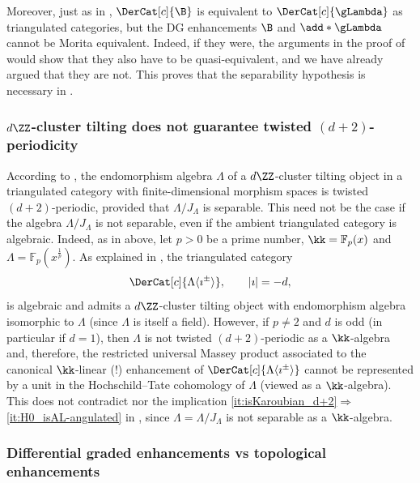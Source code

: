 \documentclass[a4paper]{amsart}
\begin{document}
Moreover, just as in \cite{RVdB20}, $\DerCat[c]{\B}$ is equivalent to $\DerCat[c]{\gLambda}$ as triangulated categories, but the DG enhancements $\B$ and $\add*{\gLambda}$ cannot be Morita equivalent. Indeed, if they were, the arguments in the proof of  would show that they also have to be quasi-equivalent, and we have already argued that they are not. This proves that the separability hypothesis is necessary in .


\subsubsection{$d\ZZ$-cluster tilting does not guarantee twisted
  $(d+2)$-periodicity}

According to , the endomorphism algebra
$\Lambda$ of a $d\ZZ$-cluster tilting object in a triangulated category with
finite-dimensional morphism spaces is twisted $(d+2)$-periodic, provided that
$\Lambda/J_\Lambda$ is separable. This need not be the case if the algebra
$\Lambda/J_\Lambda$ is not separable, even if the ambient triangulated category
is algebraic. Indeed, as in  above, let
$p>0$ be a prime number, $\kk=\mathbb{F}_p(x)$ and
$\Lambda=\mathbb{F}_p(x^{\frac{1}{p}})$. As explained in
, the triangulated category
\[
  \DerCat[c]{\Lambda\langle\imath^{\pm}\rangle},\qquad |\imath|=-d,
\]
is algebraic and admits a $d\ZZ$-cluster tilting object with endomorphism
algebra isomorphic to $\Lambda$ (since $\Lambda$ is itself a field). However, if
$p\neq2$ and $d$ is odd (in particular if $d=1$), then $\Lambda$ is not twisted
$(d+2)$-periodic as a $\kk$-algebra and, therefore, the restricted universal
Massey product associated to the canonical $\kk$-linear (!) enhancement of
$\DerCat[c]{\Lambda\langle\imath^{\pm}\rangle}$ cannot be represented by a unit
in the Hochschild--Tate cohomology of $\Lambda$ (viewed as a $\kk$-algebra).
This does not contradict  nor the implication
\eqref{it:isKaroubian_d+2}$\Rightarrow$\eqref{it:H0_isAL-angulated} in
, since $\Lambda=\Lambda/J_\Lambda$ is not separable
as a $\kk$-algebra.

\subsubsection{Differential graded enhancements vs topological enhancements}
\label{subsubsec:Morava}
\end{document}
